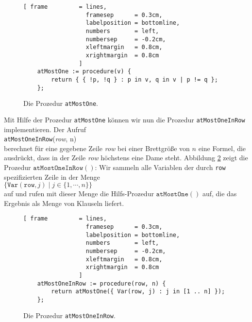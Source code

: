 \begin{figure}[!ht]
  \centering
\begin{Verbatim}[ frame         = lines, 
                  framesep      = 0.3cm, 
                  labelposition = bottomline,
                  numbers       = left,
                  numbersep     = -0.2cm,
                  xleftmargin   = 0.8cm,
                  xrightmargin  = 0.8cm
                ]
    atMostOne := procedure(v) {
        return { { !p, !q } : p in v, q in v | p != q };
    };
\end{Verbatim}
\vspace*{-0.3cm}
  \caption{Die Prozedur \texttt{atMostOne}.}
  \label{fig:atMostOne}
\end{figure}

Mit Hilfe der Prozedur \texttt{atMostOne} k\"{o}nnen wir nun die Prozedur
\texttt{atMostOneInRow} implementieren.  Der Aufruf \\[0.2cm]
\hspace*{1.3cm} \texttt{atMostOneInRow}(\textsl{row}, n) \\[0.2cm]
berechnet f\"{u}r eine gegebene Zeile \textsl{row} bei einer Brettgr\"{o}\ss{}e von $n$ eine Formel,
die ausdr\"{u}ckt, dass in der Zeile \textsl{row} h\"{o}chstens eine Dame steht.
Abbildung \ref{fig:atMostOneInRow} zeigt die
Prozedur $\texttt{atMostOneInRow}()$: Wir sammeln alle Variablen der durch \texttt{row}
spezifizierten Zeile
in der Menge 
\\[0.2cm]
\hspace*{1.3cm}
$\bigl\{ \texttt{Var}(\texttt{row},j) \mid j \in \{1, \cdots, n \} \bigr\}$
\\[0.2cm]
 auf und rufen mit dieser Menge die Hilfs-Prozedur $\texttt{atMostOne}()$ auf, die das Ergebnis
als Menge von Klauseln liefert.

\begin{figure}[!ht]
  \centering
\begin{Verbatim}[ frame         = lines, 
                  framesep      = 0.3cm, 
                  labelposition = bottomline,
                  numbers       = left,
                  numbersep     = -0.2cm,
                  xleftmargin   = 0.8cm,
                  xrightmargin  = 0.8cm
                ]
    atMostOneInRow := procedure(row, n) {
        return atMostOne({ Var(row, j) : j in [1 .. n] });
    };
\end{Verbatim}
\vspace*{-0.3cm}
  \caption{Die Prozedur \texttt{atMostOneInRow}.}
  \label{fig:atMostOneInRow}
\end{figure}

